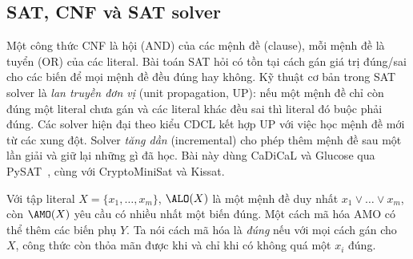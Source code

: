 \subsection{SAT, CNF và SAT solver}\label{sec:sat-bg}

Một công thức CNF là hội (AND) của các mệnh đề (clause), mỗi mệnh đề là tuyển (OR) của các literal. Bài toán SAT hỏi có tồn tại cách gán giá trị đúng/sai cho các biến để mọi mệnh đề đều đúng hay không. Kỹ thuật cơ bản trong SAT solver là \emph{lan truyền đơn vị} (unit propagation, UP): nếu một mệnh đề chỉ còn đúng một literal chưa gán và các literal khác đều sai thì literal đó buộc phải đúng. Các solver hiện đại theo kiểu CDCL kết hợp UP với việc học mệnh đề mới từ các xung đột. Solver \emph{tăng dần} (incremental) cho phép thêm mệnh đề sau một lần giải và giữ lại những gì đã học. Bài này dùng CaDiCaL và Glucose qua PySAT~\citep{ignatiev2018}, cùng với CryptoMiniSat và Kissat.

Với tập literal $X=\{x_1,\dots,x_m\}$, $\ALO(X)$ là một mệnh đề duy nhất $x_1\vee\dots\vee x_m$, còn $\AMO(X)$ yêu cầu có nhiều nhất một biến đúng. Một cách mã hóa AMO có thể thêm các biến phụ $Y$. Ta nói cách mã hóa là \emph{đúng} nếu với mọi cách gán cho $X$, công thức còn thỏa mãn được khi và chỉ khi có không quá một $x_i$ đúng.

